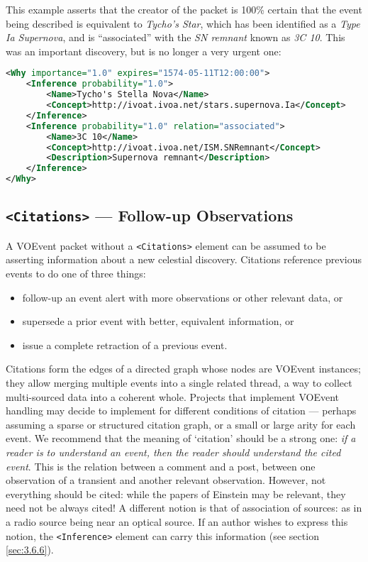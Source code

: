 \documentclass[11pt,a4paper]{ivoa}
\begin{document}
This example asserts that the creator of the packet is 100\% certain that the
event being described is equivalent to \emph{Tycho's Star}, which has been
identified as a \emph{Type Ia Supernova}, and is ``associated'' with the
\emph{SN remnant} known as \emph{3C 10}. This was an important discovery, but
is no longer a very urgent one:
\begin{lstlisting}[language=XML]
<Why importance="1.0" expires="1574-05-11T12:00:00">
    <Inference probability="1.0">
        <Name>Tycho's Stella Nova</Name>
        <Concept>http://ivoat.ivoa.net/stars.supernova.Ia</Concept>
    </Inference>
    <Inference probability="1.0" relation="associated">
        <Name>3C 10</Name>
        <Concept>http://ivoat.ivoa.net/ISM.SNRemnant</Concept>
        <Description>Supernova remnant</Description>
    </Inference>
</Why>
\end{lstlisting}

\subsection{{\tt <Citations>} --- Follow-up Observations}
\label{sec:3.7}
A VOEvent packet without a {\tt <Citations>} element can be assumed to be
asserting information about a new celestial discovery. Citations reference
previous events to do one of three things:
\begin{itemize}
\item follow-up an event alert with more observations or other relevant data, or
\item supersede a prior event with better, equivalent information, or
\item issue a complete retraction of a previous event.
\end{itemize}

Citations form the edges of a directed graph whose nodes are VOEvent instances;
they allow merging multiple events into a single related thread, a way to
collect multi-sourced data into a coherent whole. Projects that implement
VOEvent handling may decide to implement for different conditions of citation
--- perhaps assuming a sparse or structured citation graph, or a small or large
arity for each event. We recommend that the meaning of `citation' should be a
strong one: \emph{if a reader is to understand an event, then the reader should
understand the cited event}. This is the relation between a comment and a post,
between one observation of a transient and another relevant observation.
However, not everything should be cited: while the papers of Einstein may be
relevant, they need not be always cited! A different notion is that of
association of sources: as in a radio source being near an optical source. If an
author wishes to express this notion, the {\tt <Inference>} element can carry
this information (see section \ref{sec:3.6.6}).
\end{document}
